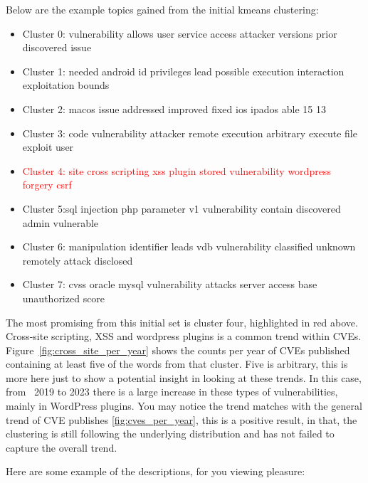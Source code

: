 \documentclass[12pt]{article}
\begin{document}
Below are the example topics gained from the initial kmeans clustering:
\begin{itemize}

	\item Cluster 0: vulnerability allows user service access attacker versions prior discovered issue

	\item Cluster 1: needed android id privileges lead possible execution interaction exploitation bounds

	\item Cluster 2: macos issue addressed improved fixed ios ipados able 15 13

	\item Cluster 3: code vulnerability attacker remote execution arbitrary execute file exploit user

	\item \textcolor{red}{Cluster 4: site cross scripting xss plugin stored vulnerability wordpress
		      forgery csrf}

	\item Cluster 5:sql injection php parameter v1 vulnerability contain discovered
	      admin vulnerable

	\item Cluster 6: manipulation identifier leads vdb vulnerability classified unknown remotely attack disclosed

	\item Cluster 7: cvss oracle mysql vulnerability attacks server access base unauthorized score
\end{itemize}

The most promising from this initial set is cluster four, highlighted in red above. Cross-site
scripting, XSS and wordpress plugins is a common trend within CVEs.
Figure~\ref{fig:cross_site_per_year} shows the counts per year of CVEs published containing at least five of the
words from that cluster. Five is arbitrary, this is more here just to show a potential insight in
looking at these trends. In this case, from ~2019 to 2023 there is a large increase in these types
of vulnerabilities, mainly in WordPress plugins. You may notice the trend matches with the general
trend of CVE publishes \ref{fig:cves_per_year}, this is a positive result, in that, the clustering
is still following the underlying distribution and has not failed to capture the overall trend.

Here are some example of the descriptions, for you viewing pleasure:
\end{document}
